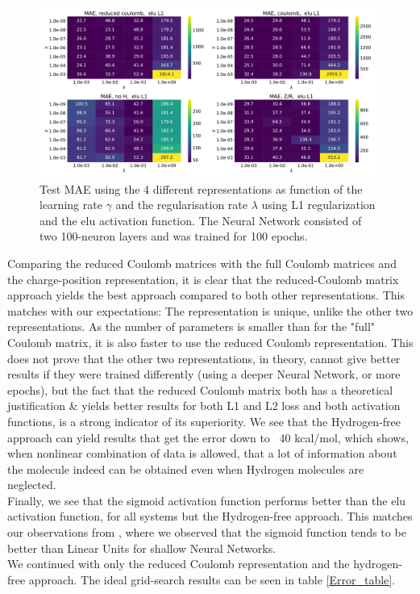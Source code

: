 \documentclass[11pt,a4paper,notitlepage]{article}
\begin{document}
\begin{figure}[H]
\centering
\includegraphics[width=1\textwidth]{nn_100_ elu L1.pdf}
\caption[NN elu L1, 100 epochs]{Test MAE using the 4 different representations as function of the learning rate $\gamma$ and the regularisation rate $\lambda$ using L1 regularization and the elu activation function. The Neural Network consisted of two 100-neuron layers and was trained for 100 epochs.} \label{fig:elu_l1_100}
\end{figure}
Comparing the reduced Coulomb matrices with the full Coulomb matrices and the charge-position representation, it is clear that the reduced-Coulomb matrix approach yields the best approach compared to both other representations. This matches with our expectations: The representation is unique, unlike the other two representations. As the number of parameters is smaller than for the "full" Coulomb matrix, it is also faster to use the reduced Coulomb representation. This does not prove that the other two representations, in theory, cannot give better results if they were trained differently (using a deeper Neural Network, or more epochs), but the fact that the reduced Coulomb matrix both has a theoretical justification \& yields better results for both L1 and L2 loss and both activation functions, is a strong indicator of its superiority. 
We see that the Hydrogen-free approach can yield results that get the error down to ~40 kcal/mol, which shows, when nonlinear combination of data is allowed, that a lot of information about the molecule indeed can be obtained even when Hydrogen molecules are neglected. \\
Finally, we see that the sigmoid activation function performs better than the elu activation function, for all systems but the Hydrogen-free approach. This matches our observations from \citep{Project2}, where we observed that the sigmoid function tends to be better than Linear Units for shallow Neural Networks.\\
We continued with only the reduced Coulomb representation and the hydrogen-free approach. The ideal grid-search results can be seen in table \ref{Error_table}.
\end{document}
